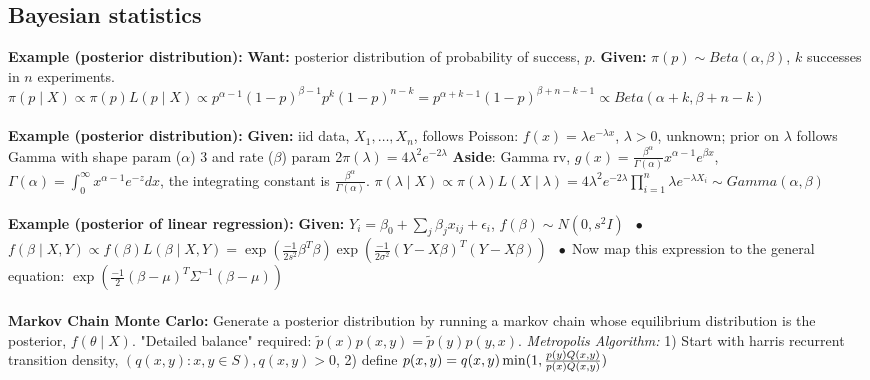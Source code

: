 \documentclass[9pt]{extarticle}
\newcommand*\bspace{$\; \bullet \;$}
\begin{document}
\subsection{Bayesian statistics}
\textbf{Example (posterior distribution):} \textbf{Want:} posterior distribution of probability of success, $p$. \textbf{Given:} $\pi(p) \sim Beta(\alpha, \beta)$, $k$ successes in $n$ experiments. $\pi(p \mid X) \propto \pi(p)L(p \mid X) \propto p^{\alpha-1}(1-p)^{\beta - 1}p^k(1-p)^{n-k} = p^{\alpha + k - 1}(1-p)^{\beta + n - k - 1} \propto Beta(\alpha + k, \beta + n - k)$\\\\
\textbf{Example (posterior distribution):} \textbf{Given:} iid data, $X_1, \dots, X_n$, follows Poisson: $f(x) = \lambda e^{-\lambda x}$, $\lambda > 0$, unknown; prior on $\lambda$ follows Gamma with shape param ($\alpha$) 3 and rate ($\beta$) param 2$\pi(\lambda) = 4\lambda^2e^{-2\lambda}$ \textbf{Aside}: Gamma rv, $g(x) = \frac{\beta^\alpha}{\Gamma(\alpha)}x^{\alpha-1}e^{\beta x}$, $\Gamma(\alpha) = \int_0^\infty x^{\alpha-1}e^{-z}dx$, the integrating constant is $\frac{\beta^\alpha}{\Gamma(\alpha)}$. $\pi(\lambda \mid X) \propto \pi(\lambda) L(X \mid \lambda) = 4\lambda^2e^{-2\lambda} \prod_{i=1}^n \lambda e^{-\lambda X_i}  \sim Gamma(\alpha, \beta)$\\\\
\textbf{Example (posterior of linear regression):} \textbf{Given:} $Y_i = \beta_0 + \sum_j\beta_jx_{ij} + \epsilon_i$, $f(\beta) \sim N(0, s^2I)$ \bspace $f(\beta \mid X, Y) \propto f(\beta)L(\beta \mid X,Y) = \exp(\frac{-1}{2s^2}\beta^T\beta)\exp(\frac{-1}{2\sigma^2}(Y - X\beta)^T(Y - X\beta))$ \bspace Now map this expression to the general equation: $\exp(\frac{-1}{2}(\beta - \mu)^T\Sigma^{-1}(\beta - \mu))$\\\\
\textbf{Markov Chain Monte Carlo:} Generate a posterior distribution by running a markov chain whose equilibrium distribution is the posterior, $f(\theta \mid X)$. "Detailed balance" required: $\tilde{p}(x)p(x,y) = \tilde{p}(y)p(y,x)$. \textit{Metropolis Algorithm:} 1) Start with harris recurrent transition density, $(q(x,y): x,y \in S), q(x,y)>0$, 2) define $p(x,y) = q(x,y) \min\large (1, \frac{p(y)Q(x,y)}{p(x)Q(x,y)} \large )$
\end{document}
